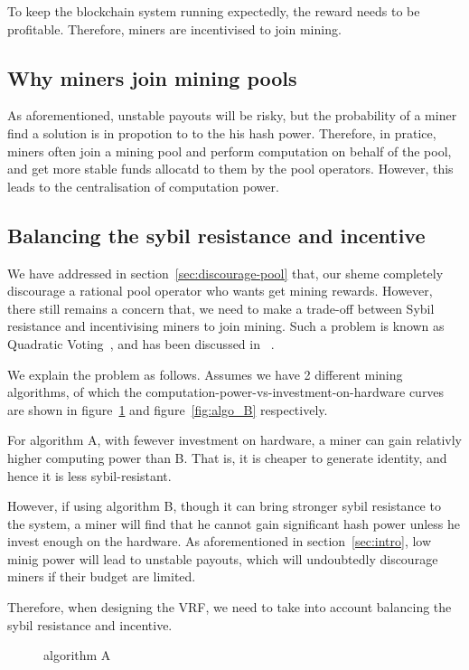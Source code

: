 To keep the blockchain system running expectedly, the reward needs to be profitable.
Therefore, miners are incentivised to join mining.

\subsection{Why miners join mining pools}

As aforementioned, unstable payouts will be risky, but the probability of a miner find a solution is in propotion to to the his hash power.
Therefore, in pratice, miners often join a mining pool and perform computation on behalf of the pool, and get more stable funds allocatd to them by the pool operators.
However, this leads to the centralisation of computation power.

\subsection{Balancing the sybil resistance and incentive}

We have addressed in section~\ref{sec:discourage-pool} that, our sheme completely discourage a rational pool operator who wants get mining rewards.
However, there still remains a concern that, we need to make a trade-off between Sybil resistance and incentivising miners to join mining.
Such a problem is known as Quadratic Voting~\cite{lalley2018quadratic}, and has been discussed in ~\cite{radical}.

We explain the problem as follows. Assumes we have 2 different mining algorithms, of which the computation-power-vs-investment-on-hardware curves are shown in figure~\ref{fig:algo_A} and figure~\ref{fig:algo_B} respectively.

For algorithm A, with fewever investment on hardware, a miner can gain relativly higher computing power than B. That is, it is cheaper to generate identity, and hence it is less sybil-resistant.

However, if using algorithm B, though it can bring stronger sybil resistance to the system, a miner will find that he cannot gain significant hash power unless he invest enough on the hardware.
As aforementioned in section~\ref{sec:intro}, low minig power will lead to unstable payouts, which will undoubtedly discourage miners if their budget are limited.

Therefore, when designing the VRF, we need to take into account balancing the sybil resistance and incentive.

\begin{figure}
\centering
{}
\caption{algorithm A}
\label{fig:algo_A}
\end{figure}


